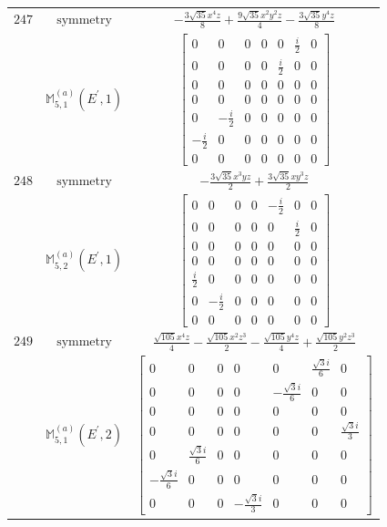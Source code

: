 \documentclass[fleqn,8pt,landscape]{jsarticle}
\begin{document}
\begin{longtable}{ccc}
$ 247 $ & $ \text{symmetry} $ & $ - \frac{3 \sqrt{35} x^{4} z}{8} + \frac{9 \sqrt{35} x^{2} y^{2} z}{4} - \frac{3 \sqrt{35} y^{4} z}{8} $ \\
$  $ & $ \mathbb{M}_{5,1}^{(a)}(E^{\prime},1) $ & $ \begin{bmatrix} 0 & 0 & 0 & 0 & 0 & \frac{i}{2} & 0 \\ 0 & 0 & 0 & 0 & \frac{i}{2} & 0 & 0 \\ 0 & 0 & 0 & 0 & 0 & 0 & 0 \\ 0 & 0 & 0 & 0 & 0 & 0 & 0 \\ 0 & - \frac{i}{2} & 0 & 0 & 0 & 0 & 0 \\ - \frac{i}{2} & 0 & 0 & 0 & 0 & 0 & 0 \\ 0 & 0 & 0 & 0 & 0 & 0 & 0 \end{bmatrix} $ \\ \hline
$ 248 $ & $ \text{symmetry} $ & $ - \frac{3 \sqrt{35} x^{3} y z}{2} + \frac{3 \sqrt{35} x y^{3} z}{2} $ \\
$  $ & $ \mathbb{M}_{5,2}^{(a)}(E^{\prime},1) $ & $ \begin{bmatrix} 0 & 0 & 0 & 0 & - \frac{i}{2} & 0 & 0 \\ 0 & 0 & 0 & 0 & 0 & \frac{i}{2} & 0 \\ 0 & 0 & 0 & 0 & 0 & 0 & 0 \\ 0 & 0 & 0 & 0 & 0 & 0 & 0 \\ \frac{i}{2} & 0 & 0 & 0 & 0 & 0 & 0 \\ 0 & - \frac{i}{2} & 0 & 0 & 0 & 0 & 0 \\ 0 & 0 & 0 & 0 & 0 & 0 & 0 \end{bmatrix} $ \\ \hline
$ 249 $ & $ \text{symmetry} $ & $ \frac{\sqrt{105} x^{4} z}{4} - \frac{\sqrt{105} x^{2} z^{3}}{2} - \frac{\sqrt{105} y^{4} z}{4} + \frac{\sqrt{105} y^{2} z^{3}}{2} $ \\
$  $ & $ \mathbb{M}_{5,1}^{(a)}(E^{\prime},2) $ & $ \begin{bmatrix} 0 & 0 & 0 & 0 & 0 & \frac{\sqrt{3} i}{6} & 0 \\ 0 & 0 & 0 & 0 & - \frac{\sqrt{3} i}{6} & 0 & 0 \\ 0 & 0 & 0 & 0 & 0 & 0 & 0 \\ 0 & 0 & 0 & 0 & 0 & 0 & \frac{\sqrt{3} i}{3} \\ 0 & \frac{\sqrt{3} i}{6} & 0 & 0 & 0 & 0 & 0 \\ - \frac{\sqrt{3} i}{6} & 0 & 0 & 0 & 0 & 0 & 0 \\ 0 & 0 & 0 & - \frac{\sqrt{3} i}{3} & 0 & 0 & 0 \end{bmatrix} $ \\ \hline

\end{longtable}
\end{document}
